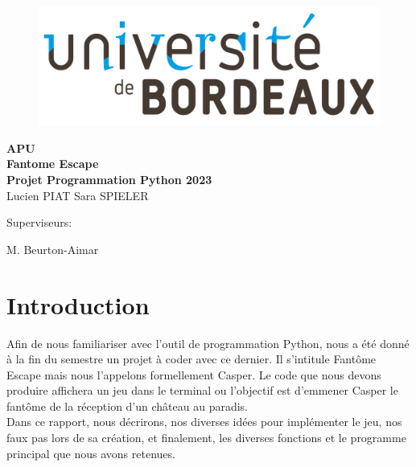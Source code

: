 \documentclass[titlepage]{report}
\begin{document}
    \begin{center}

    \begin{figure}[htbp]
        \centering
        \includegraphics[width=0.5\columnwidth]{Logo.svg.png}
    \end{figure}
    \vspace{0.5cm}

    \vspace{1.5cm}
    \Huge{\bfseries APU } \\
    \vspace{3cm}
    \Huge{\bfseries Fantome Escape} \\
    \Huge{\bfseries Projet Programmation Python 2023}\\
    \vspace{3cm}
    \huge{Lucien PIAT} 
    \huge{Sara SPIELER} \\
    \vspace{3cm}
    
    \Large Superviseurs:\\
    \vspace{0.5cm}
    \begin{minipage}{0.30\textwidth}
     \centering
    \Large{M. Beurton-Aimar}
    \end{minipage} 
    \end{center}
\thispagestyle{empty} 


    
\newpage
\tableofcontents
\thispagestyle{empty} 

\newpage
{} 

\section{Introduction}
\hspace*{0.5cm}Afin de nous familiariser avec l'outil de programmation Python, nous a été donné à la fin du semestre un projet à coder avec ce dernier. Il s'intitule Fantôme Escape mais nous l'appelons formellement Casper. Le code que nous devons produire affichera un jeu dans le terminal ou l'objectif est d'emmener Casper le fantôme de la réception d'un château au paradis.\\
\hspace*{0.5cm}Dans ce rapport, nous décrirons, nos diverses idées pour implémenter le jeu, nos faux pas lors de sa création, et finalement, les diverses fonctions et le programme principal que nous avons retenues. 
\end{document}
